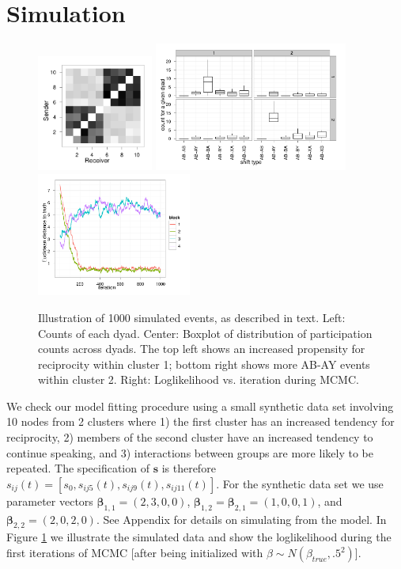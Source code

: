 \documentclass[11pt]{article}
\begin{document}
\section{Simulation}
\begin{figure}
\center
\includegraphics[width=1.5in]{../figs/syn/mat.pdf}
\includegraphics[width=2.5in]{../figs/syn/counts.pdf}
\includegraphics[width=2in]{../figs/syn/bias.pdf}
\caption{Illustration of 1000 simulated events, as described in text. Left: Counts of each dyad. Center: Boxplot of distribution of participation counts across dyads.  The top left shows an increased propensity for reciprocity within cluster 1; bottom right shows more AB-AY events within cluster 2. Right: Loglikelihood vs. iteration during MCMC.}
\label{fig:syncounts}
\end{figure}

We check our model fitting procedure using a small synthetic data set involving 10 nodes from 2 clusters where 1) the first cluster has an increased tendency for reciprocity, 2) members of the second cluster have an increased tendency to continue speaking, and 3) interactions between groups are more likely to be repeated.  The specification of $\textbf{s}$ is therefore $s_{ij}(t) = [s_0, s_{ij5}(t), s_{ij9}(t), s_{ij11}(t)]$.  For the synthetic data set we use parameter vectors $\boldsymbol{\beta}_{1,1} = (2,3,0,0)$,  $\boldsymbol{\beta}_{1,2} = \boldsymbol{\beta}_{2,1} = (1,0,0,1)$, and $\boldsymbol{\beta}_{2,2} = (2,0,2,0)$.  See Appendix for details on simulating from the model.  In Figure \ref{fig:syncounts} we illustrate the simulated data and show the loglikelihood during the first iterations of MCMC [after being initialized with $\beta \sim N(\beta_{true},.5^2)$].
\end{document}
